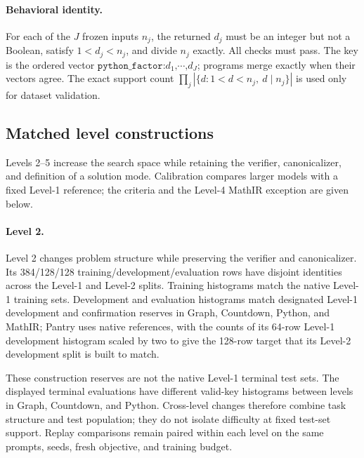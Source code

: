 \documentclass{article}
\newcommand{\1}{\mathbf 1}
\theoremstyle{remark}
\theoremstyle{definition}
\theoremstyle{plain}
\begin{document}
\paragraph{Behavioral identity.}
\label{app:python-identity}
For each of the $J$ frozen inputs $n_j$, the returned $d_j$ must be an integer
but not a Boolean, satisfy $1<d_j<n_j$, and divide $n_j$ exactly. All checks
must pass. The key is the ordered vector
$\texttt{python\_factor:}d_1\texttt{,}\cdots\texttt{,}d_J$;
programs merge exactly when their vectors agree. The exact support count
$\prod_j|\{d:1<d<n_j,\ d\mid n_j\}|$ is used only for dataset validation.

\subsection{Matched level constructions}
\label{app:data-levels}

Levels 2--5 increase the search space while retaining the verifier,
canonicalizer, and definition of a solution mode. Calibration compares larger
models with a fixed Level-1 reference; the criteria and the Level-4 MathIR
exception are given below.

\paragraph{Level 2.}
Level 2 changes problem structure while preserving the verifier and
canonicalizer. Its 384/128/128 training/development/evaluation rows have
disjoint identities across the Level-1 and Level-2 splits. Training histograms
match the native Level-1 training sets. Development and evaluation histograms
match designated Level-1 development and confirmation reserves in Graph,
Countdown, Python, and MathIR; Pantry uses native references, with the counts
of its 64-row Level-1 development histogram scaled by two to give the 128-row
target that its Level-2 development split is built to match.

These construction reserves are not the native Level-1 terminal test sets.
The displayed terminal evaluations have different valid-key histograms
between levels in Graph, Countdown, and Python. Cross-level changes therefore
combine task structure and test population; they do not isolate difficulty
at fixed test-set support. Replay comparisons remain paired within each
level on the same prompts, seeds, fresh objective, and training budget.
\end{document}
